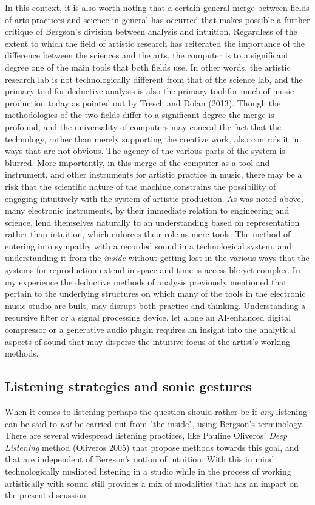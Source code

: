 \documentclass[11pt]{article}
\makeatletter
\newcommand{\cslcitation}[2]
 {\protect\hyper@linkstart{cite}{citeproc_bib_item_#1}#2\hyper@linkend}
\makeatother
\begin{document}
In this context, it is also worth noting that a certain general merge between fields of arts practices and science in general has occurred that makes possible a further critique of Bergson's division between analysis and intuition.
Regardless of the extent to which the field of artistic research has reiterated the importance of the difference between the sciences and the arts, the computer is to a significant degree one of the main tools that both fields use.
In other words, the artistic research lab is not technologically different from that of the science lab, and the primary tool for deductive analysis is also the primary tool for much of music production today as pointed out by Tresch and Dolan (\cslcitation{34}{2013}).
Though the methodologies of the two fields differ to a significant degree the merge is profound, and the universality of computers may conceal the fact that the technology, rather than merely supporting the creative work, also controls it in ways that are not obvious.
The agency of the various parts of the system is blurred.
More importantly, in this merge of the computer as a tool and instrument, and other instruments for artistic practice in music, there may be a risk that the scientific nature of the machine constrains the possibility of engaging intuitively with the system of artistic production.
As was noted above, many electronic instruments, by their immediate relation to engineering and science, lend themselves naturally to an understanding based on representation rather than intuition, which enforces their role as mere tools.
The method of entering into sympathy with a recorded sound in a technological system, and understanding it from the \emph{inside} without getting lost in the various ways that the systems for reproduction extend in space and time is accessible yet complex.
In my  experience the deductive methods of analysis previously mentioned that pertain to the underlying structures on which many of the tools in the electronic music studio are built, may disrupt both practice and thinking.
Understanding a recursive filter or a signal processing device, let alone an AI-enhanced digital compressor or a generative audio plugin requires an insight into the analytical aspects of sound that may disperse the intuitive focus of the artist's working methods.
\subsection*{Listening strategies and sonic gestures}
\label{sec:org6966bba}
When it comes to listening perhaps the question should rather be if \emph{any} listening can be said to \emph{not} be carried out from "the inside", using Bergson's terminology.
There are several widespread listening practices, like Pauline Oliveros' \emph{Deep Listening} method (\cslcitation{26}{Oliveros 2005}) that propose methods towards this goal, and that are independent of Bergson's notion of intuition.
With this in mind technologically mediated listening in a studio while in the process of working artistically with sound still provides a mix of modalities that has an impact on the present discussion.
\end{document}
